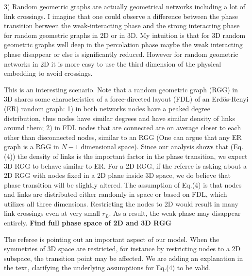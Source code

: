 \documentclass[11pt]{article}
\begin{document}
\begin{response}{
3) Random geometric graphs are actually geometrical networks including a lot of link crossings. I imagine that one could observe a difference between the phase transition between the weak-interacting phase and the strong interacting phase for random geometric graphs in 2D or in 3D. My intuition is that for 3D random geometric graphs well deep in the percolation phase maybe the weak interacting phase disappear or else is significantly reduced. However for random geometric networks in 2D it is more easy to use the third dimension of the physical embedding to avoid crossings. 
}

This is an interesting scenario. 
Note that a random geometric graph (RGG) in 3D shares some characteristics of a force-directed layout (FDL) of an Erd\"os-Renyi (ER) random graph: 
1) in both networks nodes have a peaked degree distribution, thus nodes have similar degrees and have similar density of links around them; 2) in FDL nodes that are connected are on average closer to each other than disconnected nodes, similar to an RGG (One can argue that any ER graph is a RGG in $N-1$ dimensional space). 
Since our analysis shows that (Eq.(4)) the density of links is the important factor in the phase transition, we expect 3D RGG to behave similar to ER. 
For a 2D RGG, if the referee is asking about a 2D RGG with nodes fixed in a 2D plane inside 3D space, we do believe that phase transition will be slightly altered. 
The assumption of Eq.(4) is that nodes and links are distributed either randomly in space or based on FDL, which utilizes all three dimensions. 
Restricting the nodes to 2D would result in many link crossings even at very small $r_L$. 
As a result, the weak phase may disappear entirely. 
{\color{red}\bf  Find full phase space of 2D and 3D RGG}

The referee is pointing out an important aspect of our model. 
When the symmetries of 3D space are restricted, for instance by restricting nodes to a 2D subspace, the transition point may be affected. We are adding an explanation in the text, clarifying the underlying assumptions for Eq.(4) to be valid.


\end{response}
\end{document}

